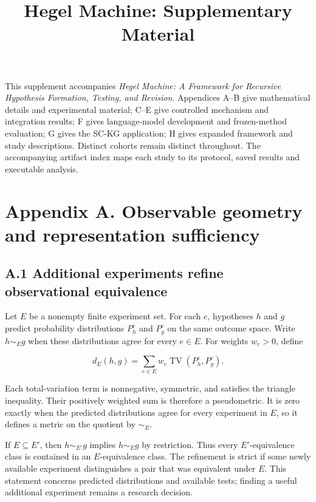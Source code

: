 \documentclass[11pt,a4paper]{article}
\author{}
\date{}
\begin{document}
\title{Hegel Machine: Supplementary Material}
\maketitle

This supplement accompanies \emph{Hegel Machine: A Framework for Recursive Hypothesis Formation, Testing, and Revision}. Appendices A–B give mathematical details and experimental material; C–E give controlled mechanism and integration results; F gives language-model development and frozen-method evaluation; G gives the SC-KG application; H gives expanded framework and study descriptions. Distinct cohorts remain distinct throughout. The accompanying artifact index maps each study to its protocol, saved results and executable analysis.


\clearpage

\section*{Appendix A. Observable geometry and representation sufficiency}

\subsection*{A.1 Additional experiments refine observational equivalence}

Let \(E\) be a nonempty finite experiment set. For each \(e\), hypotheses \(h\) and \(g\) predict probability distributions \(P_h^e\) and \(P_g^e\) on the same outcome space. Write \(h\sim_Eg\) when these distributions agree for every \(e\in E\). For weights \(w_e>0\), define


\[
d_E(h,g)=\sum_{e\in E}w_e\operatorname{TV}(P_h^e,P_g^e).
\]


Each total-variation term is nonnegative, symmetric, and satisfies the triangle inequality. Their positively weighted sum is therefore a pseudometric. It is zero exactly when the predicted distributions agree for every experiment in \(E\), so it defines a metric on the quotient by \(\sim_E\).


If \(E\subseteq E'\), then \(h\sim_{E'}g\) implies \(h\sim_Eg\) by restriction. Thus every \(E'\)-equivalence class is contained in an \(E\)-equivalence class. The refinement is strict if some newly available experiment distinguishes a pair that was equivalent under \(E\). This statement concerns predicted distributions and available tests; finding a useful additional experiment remains a research decision.
\end{document}
